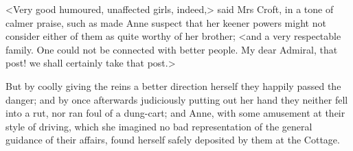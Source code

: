 <Very good humoured, unaffected girls, indeed,> said Mrs Croft, in a tone of calmer praise, such as made Anne suspect that her keener powers might not consider either of them as quite worthy of her brother; <and a very respectable family. One could not be connected with better people. My dear Admiral, that post! we shall certainly take that post.>

But by coolly giving the reins a better direction herself they happily passed the danger; and by once afterwards judiciously putting out her hand they neither fell into a rut, nor ran foul of a dung-cart; and Anne, with some amusement at their style of driving, which she imagined no bad representation of the general guidance of their affairs, found herself safely deposited by them at the Cottage.